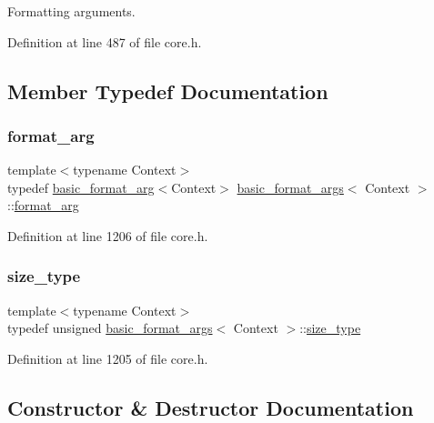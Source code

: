 Formatting arguments. 

Definition at line 487 of file core.\+h.



\subsection{Member Typedef Documentation}
\mbox{\label{classbasic__format__args_aa8e7659bf8a41ef7cf889bd3edcbc129}} 
\subsubsection{\texorpdfstring{format\+\_\+arg}{format\_arg}}
{\footnotesize\ttfamily template$<$typename Context$>$ \\
typedef \hyperlink{classbasic__format__arg}{basic\+\_\+format\+\_\+arg}$<$Context$>$ \hyperlink{classbasic__format__args}{basic\+\_\+format\+\_\+args}$<$ Context $>$\+::\hyperlink{classbasic__format__args_aa8e7659bf8a41ef7cf889bd3edcbc129}{format\+\_\+arg}}



Definition at line 1206 of file core.\+h.

\mbox{\label{classbasic__format__args_abced2890cde3213027d493494d89c611}} 
\subsubsection{\texorpdfstring{size\+\_\+type}{size\_type}}
{\footnotesize\ttfamily template$<$typename Context$>$ \\
typedef unsigned \hyperlink{classbasic__format__args}{basic\+\_\+format\+\_\+args}$<$ Context $>$\+::\hyperlink{classbasic__format__args_abced2890cde3213027d493494d89c611}{size\+\_\+type}}



Definition at line 1205 of file core.\+h.



\subsection{Constructor \& Destructor Documentation}
\mbox{\label{classbasic__format__args_a1a0b07912511030ffbe01a71e7baee22}} 
